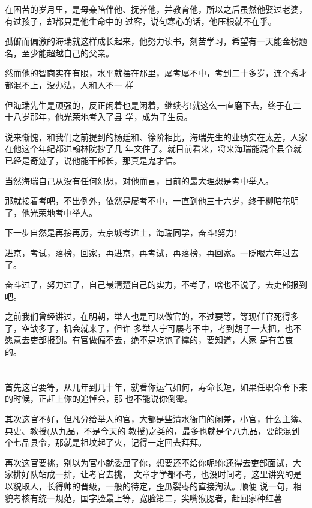 \documentclass[11pt,a4paper,onecolumn]{article}
\begin{document}
在困苦的岁月里，是母亲陪伴他、抚养他，并教育他，所以之后虽然他娶过老婆，有过孩子，却都只是他生命中的
过客，说句寒心的话，他压根就不在乎。

孤僻而偏激的海瑞就这样成长起来，他努力读书，刻苦学习，希望有一天能金榜题名，至少能超越自己的父亲。

然而他的智商实在有限，水平就摆在那里，屡考屡不中，考到二十多岁，连个秀才都混不上，没办法，人和人不一
样

但海瑞先生是顽强的，反正闲着也是闲着，继续考!就这么一直磨下去，终于在二十八岁那年，他光荣地考入了县
学，成为了生员。

说来惭愧，和我们之前提到的杨廷和、徐阶相比，海瑞先生的业绩实在太差，人家在他这个年纪都进翰林院抄了几
年文件了。就目前看来，将来海瑞能混个县令就已经是奇迹了，说他能干部长，那真是鬼才信。

当然海瑞自己从没有任何幻想，对他而言，目前的最大理想是考中举人。

那就接着考吧，不出例外，依然是屡考不中，一直到他三十六岁，终于柳暗花明了，他光荣地考中举人。

下一步自然是再接再厉，去京城考进士，海瑞同学，奋斗!努力!

进京，考试，落榜，回家，再进京，再考试，再落榜，再回家。一眨眼六年过去了。

奋斗过了，努力过了，自己最清楚自己的实力，不考了，啥也不说了，去吏部报到吧。

之前我们曾经讲过，在明朝，举人也是可以做官的，不过要等，等现任官死得多了，空缺多了，机会就来了，但许
多举人宁可屡考不中，考到胡子一大把，也不愿意去吏部报到。有官做偏不去，绝不是吃饱了撑的，要知道，人家
是有苦衷的。

\section[\thesection]{}

首先这官要等，从几年到几十年，就看你运气如何，寿命长短，如果任职命令下来的时候，正赶上你的追悼会，那
也不能说你倒霉。

其次这官不好，但凡分给举人的官，大都是些清水衙门的闲差，小官，什么主簿、典史、教授(从九品，不是今天的
教授)之类的，最多也就是个八九品，要能混到个七品县令，那就是祖坟起了火，记得一定回去拜拜。

再次这官要挑，别以为官小就委屈了你，想要还不给你呢!你还得去吏部面试，大家排好队站成一排，让考官去挑，
文章才学都不考，也没时间考，这里讲究的是以貌取人，长得帅的晋级，一般的待定，歪瓜裂枣的直接淘汰。顺便
说一句，相貌考核有统一规范，国字脸最上等，宽脸第二，尖嘴猴腮者，赶回家种红薯
\end{document}
